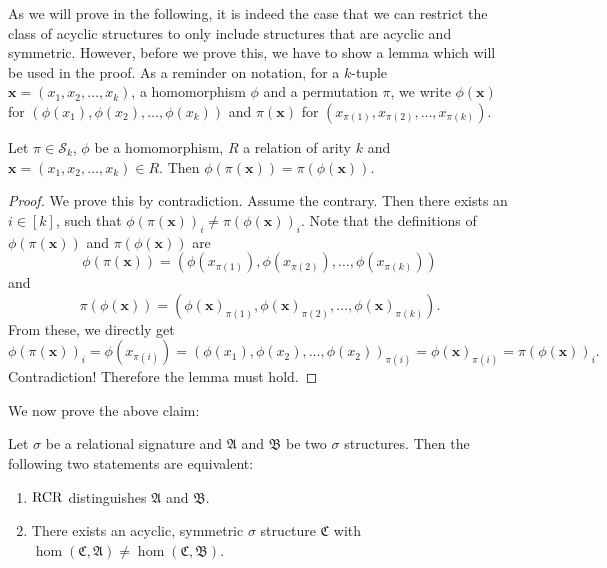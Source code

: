As we will prove in the following, it is indeed the case that we can restrict the class of acyclic structures to only include structures that are acyclic and symmetric.
However, before we prove this, we have to show a lemma which will be used in the proof.
As a reminder on notation, for a $k$-tuple $\mathbf x=(x_1,x_2,\dots,x_k)$, a homomorphism $\phi$ and a permutation $\pi$, we write $\phi(\mathbf x)$ for $(\phi(x_1),\phi(x_2),\dots,\phi(x_k))$ and $\pi(\mathbf x)$ for $(x_{\pi(1)},x_{\pi(2)},\dots,x_{\pi(k)})$.
\begin{lemma}
	Let $\pi\in\mathcal S_k$, $\phi$ be a homomorphism, $R$ a relation of arity $k$ and $\mathbf x=(x_1,x_2,\dots,x_k)\in R$.
	Then $\phi(\pi(\mathbf x))=\pi(\phi(\mathbf x))$.
	\label{HomAndPermutCommute}
\end{lemma}
\begin{proof}
	We prove this by contradiction.
	Assume the contrary.
	Then there exists an $i\in[k]$, such that $\phi(\pi(\mathbf x))_i\neq \pi(\phi(\mathbf x))_i$.
	Note that the definitions of $\phi(\pi(\mathbf x))$ and $\pi(\phi(\mathbf x))$ are 
	$$\phi(\pi(\mathbf x)) = (\phi(x_{\pi(1)}), \phi(x_{\pi(2)}),\dots,\phi(x_{\pi(k)}))$$
	and
	$$\pi(\phi(\mathbf x)) = (\phi(\mathbf x)_{\pi(1)},\phi(\mathbf x)_{\pi(2)},\dots,\phi(\mathbf x)_{\pi(k)}).$$
	From these, we directly get
	$$\phi(\pi(\mathbf x))_i=\phi(x_{\pi(i)})=(\phi(x_1),\phi(x_2),\dots,\phi(x_2))_{\pi(i)}=\phi(\mathbf x)_{\pi(i)}=\pi(\phi(\mathbf x))_i.$$
	Contradiction!
	Therefore the lemma must hold.
\end{proof}
We now prove the above claim:
\begin{theorem}
	Let $\sigma$ be a relational signature and $\mathfrak A$ and $\mathfrak B$ be two $\sigma$ structures.
	Then the following two statements are equivalent:
	\begin{enumerate}
		\item $\operatorname{RCR}$ distinguishes $\mathfrak A$ and $\mathfrak B$.
		\item There exists an acyclic, symmetric $\sigma$ structure $\mathfrak C$ with $\hom(\mathfrak C,\mathfrak A)\neq \hom(\mathfrak C,\mathfrak B)$.
	\end{enumerate}
\end{theorem}
